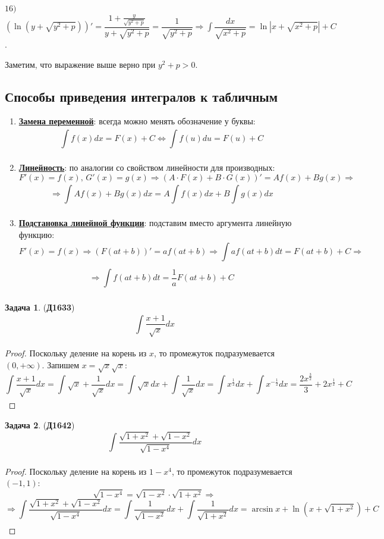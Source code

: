\documentclass[12pt]{article}
\theoremstyle{definition}
\newtheorem{problem}{Задача}
\newcommand{\ddint}[2]{\displaystyle\int\limits_{#1}^{#2}}
\begin{document}
$16)$ $\left(\ln{(y + \sqrt{y^2 + p})}\right)' = \dfrac{1 + \frac{y}{\sqrt{y^2 + p}}}{y + \sqrt{y^2 + p}} = \dfrac{1}{\sqrt{y^2 + p}} \Rightarrow \ddint{}{}\dfrac{dx}{\sqrt{x^2 + p}} = \ln{\left|x + \sqrt{x^2 + p}\right|} + C$.

Заметим, что выражение выше верно при $y^2 + p > 0$.

\subsection*{Способы приведения интегралов к табличным}
\begin{enumerate}[label=\arabic*)]
	\item \uline{\textbf{Замена переменной}}: всегда можно менять обозначение у буквы:
	$$
		\ddint{}{}f(x)dx = F(x) + C \Leftrightarrow \ddint{}{}f(u)du = F(u) + C
	$$
	\item \uline{\textbf{Линейность}}: по аналогии со свойством линейности для производных:
	$$
		F'(x) = f(x), \, G'(x) = g(x) \Rightarrow  (A{\cdot}F(x) + B{\cdot}G(x))' = Af(x) +  Bg(x) \Rightarrow
	$$
	$$
		\Rightarrow \ddint{}{}Af(x) + Bg(x)dx = A\ddint{}{}f(x)dx + B\ddint{}{}g(x) dx
	$$
	\item \uline{\textbf{Подстановка линейной функции}}: подставим вместо аргумента линейную функцию:
	$$
		F'(x) = f(x) \Rightarrow (F(at + b))' = af(at + b) \Rightarrow \ddint{}{}af(at + b)dt = F(at + b) + C \Rightarrow
	$$
	$$
		\Rightarrow \ddint{}{}f(at + b)dt = \dfrac{1}{a}F(at + b) + C
	$$
\end{enumerate}

\begin{problem}(\textbf{Д1633})
	$$\ddint{}{}\dfrac{x+1}{\sqrt{x}}dx$$
\end{problem}
\begin{proof}
	Поскольку деление на корень из $x$, то промежуток подразумевается $(0, +\infty)$. Запишем $x = \sqrt{x}\sqrt{x}$:
	$$
		\ddint{}{}\dfrac{x+1}{\sqrt{x}}dx = \ddint{}{}\sqrt{x} + \dfrac{1}{\sqrt{x}}dx = \ddint{}{}\sqrt{x}dx + \ddint{}{}\dfrac{1}{\sqrt{x}}dx = \ddint{}{}x^{\frac{1}{2}}dx + \ddint{}{}x^{-\frac{1}{2}}dx = \dfrac{2x^{\frac{3}{2}}}{3} + 2x^{\frac{1}{2}} + C
	$$
\end{proof}
\newpage
\begin{problem}(\textbf{Д1642})
	$$\ddint{}{}\dfrac{\sqrt{1 + x^2} + \sqrt{1 - x^2}}{\sqrt{1 - x^4}}dx$$
\end{problem}
\begin{proof}
	Поскольку деление на корень из $1 -x^4$, то промежуток подразумевается $(-1, 1)$:
	$$
		\sqrt{1 - x^4} = \sqrt{1 - x^2}{\cdot}\sqrt{1 + x^2} \Rightarrow 
	$$
	$$	
		\Rightarrow \ddint{}{}\dfrac{\sqrt{1 + x^2} + \sqrt{1 - x^2}}{\sqrt{1 - x^4}}dx = \ddint{}{}\dfrac{1}{\sqrt{1-x^2}}dx + \ddint{}{}\dfrac{1}{\sqrt{1 + x^2}}dx = \arcsin{x} + \ln(x + \sqrt{1 + x^2}) + C
	$$
\end{proof}
\end{document}
